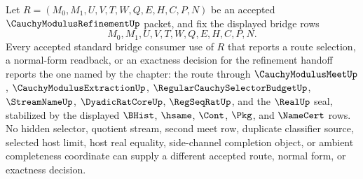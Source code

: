 \begin{corollary}
\label{cor:cauchy-modulus-refinement-bridged-route-consumer-determinacy}
Let $R=(M_0,M_1,U,V,T,W,Q,E,H,C,P,N)$ be an accepted $\CauchyModulusRefinementUp$ packet, and fix the displayed bridge rows
$$
M_0,M_1,U,V,T,W,Q,E,H,C,P,N.
$$
Every accepted standard bridge consumer use of $R$ that reports a route selection, a normal-form readback, or an exactness decision for the refinement handoff reports the one named by the chapter: the route through $\CauchyModulusMeetUp$, $\CauchyModulusExtractionUp$, $\RegularCauchySelectorBudgetUp$, $\StreamNameUp$, $\DyadicRatCoreUp$, $\RegSeqRatUp$, and the $\RealUp$ seal, stabilized by the displayed $\BHist$, $\hsame$, $\Cont$, $\Pkg$, and $\NameCert$ rows. No hidden selector, quotient stream, second meet row, duplicate classifier source, selected host limit, host real equality, side-channel completion object, or ambient completeness coordinate can supply a different accepted route, normal form, or exactness decision.
\end{corollary}
